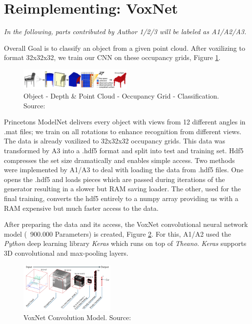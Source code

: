 \documentclass[10pt,twocolumn,letterpaper]{article}
\begin{document}
\section{Reimplementing: VoxNet \cite{voxnet}}

\textit{In the following, parts contributed by Author 1/2/3 will be labeled 
as A1/A2/A3.}

Overall Goal is to classify an object from a given point cloud. After voxilizing to format 32x32x32, we train our CNN on these occupancy grids, Figure \ref{fig:algo}.

\begin{figure}[h]
	\label{fig:algo}
	\centering
	\includegraphics[width=0.5\textwidth]{figures/algo}
	\caption{ \newline Object - Depth \& Point Cloud - Occupancy Grid - Classification. Source: \cite{shape}}
\end{figure}

Princetons ModelNet delivers every object with views from 12 different angles in .mat files; we train on all rotations to enhance recognition from 
different views. The data is already voxilized to 32x32x32 occupancy grids.
This data was transformed by A3 into a .hdf5 format and split into test and training set. Hdf5 compresses the set size dramatically and enables simple access.
Two methods were implemented by A1/A3 to deal with loading the data from .hdf5 files. One opens the .hdf5 and loads pieces which are passed during iterations of the generator resulting in a slower but RAM saving loader. The other, used for the final training, converts the hdf5 entirely to a numpy array providing us with a RAM expensive but much faster access to the data.

After preparing the data and its access, the VoxNet convolutional neural network model (~900.000 Parameters) is created, Figure \ref{fig:model}. For this, A1/A2 used the \textit{Python} deep learning library \textit{Keras} which runs on top of \textit{Theano}. \textit{Keras} supports 3D convolutional and max-pooling layers. 

\begin{figure}[h]
	\label{fig:model}
	\centering
	\includegraphics[width=0.42\textwidth]{figures/model}
	\caption{VoxNet Convolution Model. Source: \cite{mature}}
\end{figure}
\end{document}
